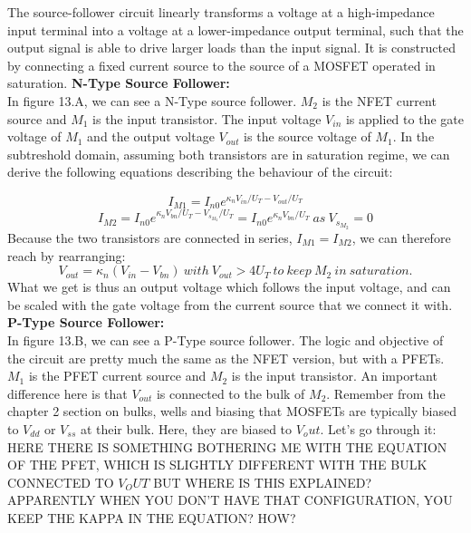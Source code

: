 The source-follower circuit linearly transforms a voltage at a high-impedance input terminal into a voltage at a lower-impedance output terminal, such that the output signal is able to drive larger loads than the input signal. It is constructed by connecting a fixed current source to the source of a MOSFET operated in saturation. 
\newline \newline
\textbf{N-Type Source Follower:} 
\\
In figure 13.A, we can see a N-Type source follower. $M_{2}$ is the NFET current source and $M_{1}$ is the input transistor. The input voltage $V_{in}$ is applied to the gate voltage of $M_1$ and the output voltage $V_{out}$ is the source voltage of $M_1$. In the subtreshold domain, assuming both transistors are in saturation regime, we can derive the following equations describing the behaviour of the circuit:  

\begin{equation}
I_{M1} = I_{n0}e^{\kappa_n V_{in}/U_T - V_{out}/U_T}
\end{equation}
\begin{equation}
I_{M2} = I_{n0}e^{\kappa_n V_{bn}/U_T - V_{s_{M_2}}/U_T} = I_{n0}e^{\kappa_n V_{bn}/U_T} \ as \ V_{s_{M_2}} = 0
\end{equation}
Because the two transistors are connected in series, $I_{M1} = I_{M2}$, we can therefore reach by rearranging:
\begin{equation}
V_{out} = \kappa_n(V_{in} - V_{bn}) \ with \ V_{out} > 4U_T \ to \ keep \ M_2 \ in \ saturation.
\end{equation}
What we get is thus an output voltage which follows the input voltage, and can be scaled with the gate voltage from the current source that we connect it with.
\newline \newline
\textbf{P-Type Source Follower:} \
\\
In figure 13.B, we can see a P-Type source follower. The logic and objective of the circuit are pretty much the same as the NFET version, but with a PFETs.  $M_{1}$ is the PFET current source and $M_{2}$ is the input transistor. An important difference here is that $V_{out}$ is connected to the bulk of $M_2$. Remember from the chapter 2 section on bulks, wells and biasing that MOSFETs are typically biased to $V_{dd}$ or $V_{ss}$ at their bulk. Here, they are biased to $V_out$.  Let's go through it: HERE THERE IS SOMETHING BOTHERING ME WITH THE EQUATION OF THE PFET, WHICH IS SLIGHTLY DIFFERENT WITH THE BULK CONNECTED TO $V_OUT$ BUT WHERE IS THIS EXPLAINED? APPARENTLY WHEN YOU DON'T HAVE THAT CONFIGURATION, YOU KEEP THE KAPPA IN THE EQUATION? HOW? 

